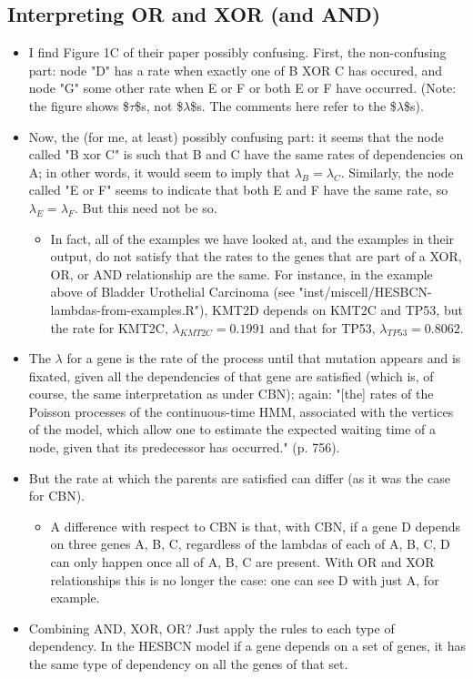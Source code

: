 \documentclass[11pt]{article}
\begin{document}
\subsection{Interpreting OR and XOR (and AND)}
\label{sec:org94629c0}
\begin{itemize}
\item I find Figure 1C  of their paper possibly confusing. First, the non-confusing part:  node "D" has a rate when exactly one of B XOR C has occured, and node "G" some other rate when E or F or both E or F have occurred. (Note: the figure shows \$\(\tau\)\$s, not \$\(\lambda\)\$s. The comments here refer to the \$\(\lambda\)\$s).
\item Now, the (for me, at least) possibly confusing part: it seems that the node called "B xor C" is such that B and C have the same rates of dependencies on A; in other words, it would seem to imply that \(\lambda_B = \lambda_C\). Similarly, the node called "E or F" seems to indicate that both E and F have the same rate, so \(\lambda_E = \lambda_F\). But this need not be so.
\begin{itemize}
\item In fact, all of the examples we have looked at, and the examples in their output, do not satisfy that the rates to the genes that are part of a XOR, OR, or AND relationship are the same. For instance, in the example above of Bladder Urothelial Carcinoma (see "inst/miscell/HESBCN-lambdas-from-examples.R"), KMT2D depends on KMT2C and TP53, but the rate for KMT2C, \(\lambda_{KMT2C} = 0.1991\) and that for TP53, \(\lambda_{TP53} = 0.8062\).
\end{itemize}
\item The \(\lambda\) for a gene is the rate of the process until that mutation appears and is fixated, given all the dependencies of that gene are satisfied (which is, of course, the same interpretation as under CBN); again:  "[the] rates of the Poisson processes of the continuous-time HMM, associated with the vertices of the model, which allow one to estimate the expected waiting time of a node, given that its predecessor has occurred." (p. 756).
\item But the rate at which the parents are satisfied can differ (as it was the case for CBN).
\begin{itemize}
\item A difference with respect to CBN is that, with CBN, if a gene D depends on three genes A, B, C, regardless of the lambdas of each of A, B, C, D can only happen once all of A, B, C are present. With OR and XOR relationships this is no longer the case: one can see D with just A, for example.
\end{itemize}
\item Combining AND, XOR, OR? Just apply the rules to each type of dependency. In the HESBCN model if a gene depends on a set of genes, it has the same type of dependency on all the genes of that set.
\end{itemize}
\end{document}
